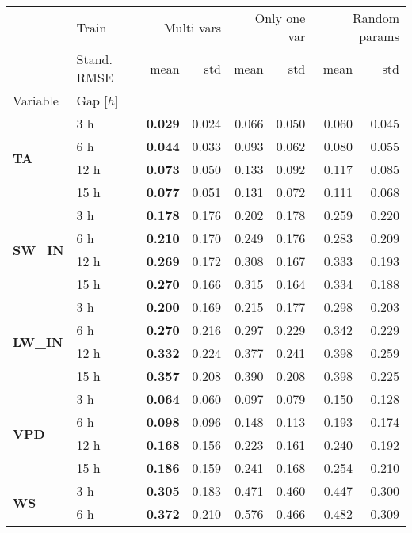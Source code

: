 \begin{table}
\centering
\caption{\CapTrain}
\label{tbl:train_compare}
\begin{tabular}{p{2.1cm}l|rr|rr|rr}
\toprule
 & Train & \multicolumn{2}{r}{Multi vars} & \multicolumn{2}{r}{Only one var} & \multicolumn{2}{r}{Random params} \\
 & Stand. RMSE & mean & std & mean & std & mean & std \\
Variable & Gap [$h$] &  &  &  &  &  &  \\
\midrule
\multirow[c]{4}{*}{\textbf{TA}} & 3 h & \bfseries 0.029 & 0.024 & 0.066 & 0.050 & 0.060 & 0.045 \\
 & 6 h & \bfseries 0.044 & 0.033 & 0.093 & 0.062 & 0.080 & 0.055 \\
 & 12 h & \bfseries 0.073 & 0.050 & 0.133 & 0.092 & 0.117 & 0.085 \\
 & 15 h & \bfseries 0.077 & 0.051 & 0.131 & 0.072 & 0.111 & 0.068 \\
\cline{1-8}
\multirow[c]{4}{*}{\textbf{SW\_IN}} & 3 h & \bfseries 0.178 & 0.176 & 0.202 & 0.178 & 0.259 & 0.220 \\
 & 6 h & \bfseries 0.210 & 0.170 & 0.249 & 0.176 & 0.283 & 0.209 \\
 & 12 h & \bfseries 0.269 & 0.172 & 0.308 & 0.167 & 0.333 & 0.193 \\
 & 15 h & \bfseries 0.270 & 0.166 & 0.315 & 0.164 & 0.334 & 0.188 \\
\cline{1-8}
\multirow[c]{4}{*}{\textbf{LW\_IN}} & 3 h & \bfseries 0.200 & 0.169 & 0.215 & 0.177 & 0.298 & 0.203 \\
 & 6 h & \bfseries 0.270 & 0.216 & 0.297 & 0.229 & 0.342 & 0.229 \\
 & 12 h & \bfseries 0.332 & 0.224 & 0.377 & 0.241 & 0.398 & 0.259 \\
 & 15 h & \bfseries 0.357 & 0.208 & 0.390 & 0.208 & 0.398 & 0.225 \\
\cline{1-8}
\multirow[c]{4}{*}{\textbf{VPD}} & 3 h & \bfseries 0.064 & 0.060 & 0.097 & 0.079 & 0.150 & 0.128 \\
 & 6 h & \bfseries 0.098 & 0.096 & 0.148 & 0.113 & 0.193 & 0.174 \\
 & 12 h & \bfseries 0.168 & 0.156 & 0.223 & 0.161 & 0.240 & 0.192 \\
 & 15 h & \bfseries 0.186 & 0.159 & 0.241 & 0.168 & 0.254 & 0.210 \\
\cline{1-8}
\multirow[c]{4}{*}{\textbf{WS}} & 3 h & \bfseries 0.305 & 0.183 & 0.471 & 0.460 & 0.447 & 0.300 \\
 & 6 h & \bfseries 0.372 & 0.210 & 0.576 & 0.466 & 0.482 & 0.309 \\

\end{tabular}
\end{table}
